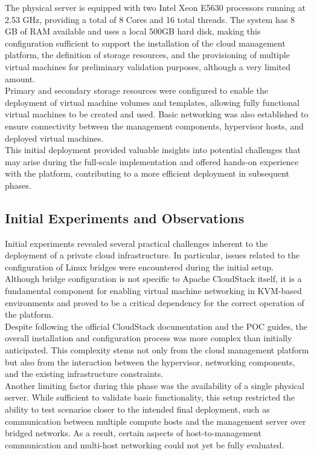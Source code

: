 \documentclass[sigplan]{acmart}
\begin{document}
        The physical server is equipped with two Intel Xeon E5630 processors running at 2.53 GHz, providing a total of 8 Cores and 16 total threads. The system has 8 GB of RAM available and uses a local 500GB hard disk, making this configuration sufficient to support the installation of the cloud management platform, the definition of storage resources, and the provisioning of multiple virtual machines for preliminary validation purposes, although a very limited amount.\\
        
        Primary and secondary storage resources were configured to enable the deployment of virtual machine volumes and templates, allowing fully functional virtual machines to be created and used. Basic networking was also established to ensure connectivity between the management components, hypervisor hosts, and deployed virtual machines.\\
        
        This initial deployment provided valuable insights into potential challenges that may arise during the full-scale implementation and offered hands-on experience with the platform, contributing to a more efficient deployment in subsequent phases.
    
    \subsection{Initial Experiments and Observations}
        Initial experiments revealed several practical challenges inherent to the deployment of a private cloud infrastructure. In particular, issues related to the configuration of Linux bridges were encountered during the initial setup. Although bridge configuration is not specific to Apache CloudStack itself, it is a fundamental component for enabling virtual machine networking in KVM-based environments and proved to be a critical dependency for the correct operation of the platform.\\

        Despite following the official CloudStack documentation and the POC guides, the overall installation and configuration process was more complex than initially anticipated. This complexity stems not only from the cloud management platform but also from the interaction between the hypervisor, networking components, and the existing infrastructure constraints.\\
        
        Another limiting factor during this phase was the availability of a single physical server. While sufficient to validate basic functionality, this setup restricted the ability to test scenarios closer to the intended final deployment, such as communication between multiple compute hosts and the management server over bridged networks. As a result, certain aspects of host-to-management communication and multi-host networking could not yet be fully evaluated.\\
        
\end{document}
